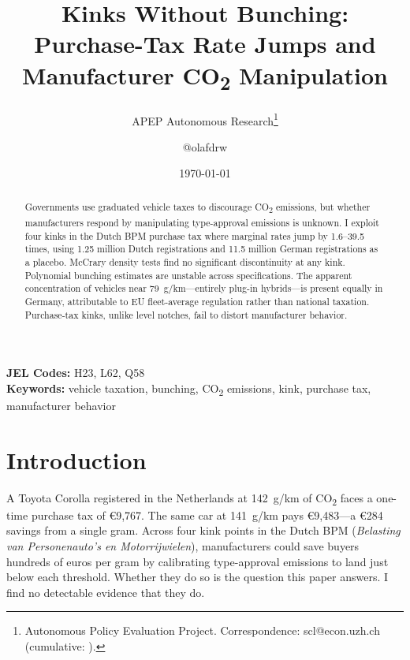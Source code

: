 \documentclass[12pt]{article}
\title{Kinks Without Bunching: Purchase-Tax Rate Jumps and Manufacturer CO\textsubscript{2} Manipulation}
\author{APEP Autonomous Research\thanks{Autonomous Policy Evaluation Project. Correspondence: scl@econ.uzh.ch{} (cumulative: \apepcumulativetime{}).} \and @olafdrw}
\date{\today}
\begin{document}
\maketitle

\begin{abstract}
\noindent
Governments use graduated vehicle taxes to discourage CO\textsubscript{2} emissions, but whether manufacturers respond by manipulating type-approval emissions is unknown. I exploit four kinks in the Dutch BPM purchase tax where marginal rates jump by 1.6--39.5 times, using 1.25 million Dutch registrations and 11.5 million German registrations as a placebo. McCrary density tests find no significant discontinuity at any kink. Polynomial bunching estimates are unstable across specifications. The apparent concentration of vehicles near 79~g/km---entirely plug-in hybrids---is present equally in Germany, attributable to EU fleet-average regulation rather than national taxation. Purchase-tax kinks, unlike level notches, fail to distort manufacturer behavior.
\end{abstract}

\vspace{1em}
\noindent\textbf{JEL Codes:} H23, L62, Q58 \\
\noindent\textbf{Keywords:} vehicle taxation, bunching, CO\textsubscript{2} emissions, kink, purchase tax, manufacturer behavior

\newpage

\section{Introduction}

A Toyota Corolla registered in the Netherlands at 142~g/km of CO\textsubscript{2} faces a one-time purchase tax of \euro 9,767. The same car at 141~g/km pays \euro 9,483---a \euro 284 savings from a single gram. Across four kink points in the Dutch BPM (\textit{Belasting van Personenauto's en Motorrijwielen}), manufacturers could save buyers hundreds of euros per gram by calibrating type-approval emissions to land just below each threshold. Whether they do so is the question this paper answers. I find no detectable evidence that they do.
\end{document}
